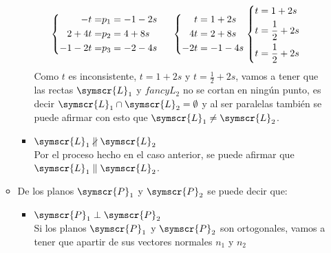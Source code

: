 \documentclass{article}
\def\fancyL{\symscr{L}}
\def\fancyP{\symscr{P}}
\begin{document}
\begin{enumerate}
\begin{itemize}
\begin{itemize}
\[                    \]
                    \[
                        \left\{
                        \begin{aligned}
                            -t = &p_1 = -1 -2s \\
                            2 + 4t = &p_2 = 4 + 8s \\
                            -1 -2t = &p_3 = -2 -4s 
                        \end{aligned}
                        \right.
                        \hspace{0.5cm}
                        \left\{
                        \begin{aligned}
                            t &= 1 +2s \\
                            4t &= 2 + 8s \\
                            -2t &= -1 -4s 
                        \end{aligned}
                        \right.
                        \left\{
                        \begin{aligned}
                            t &= 1 +2s \\
                            t &= \frac{1}{2} + 2s \\
                            t &= \frac{1}{2} + 2s 
                        \end{aligned}
                        \right.
                        \hspace{0.5cm}
                    \]
                    Como \(t\) es inconsistente, \(t = 1 + 2s\) y \(t = \frac{1}{2} + 2s\), vamos a tener que las rectas \(\fancyL_1\) y \(fancyL_2\) no se cortan en ningún punto,
                    es decir \(\fancyL_1 \cap \fancyL_2 = \emptyset\) y al ser paralelas también se puede afirmar con esto que \(\fancyL_1 \neq \fancyL_2\).
                \item \(\fancyL_1 \nparallel \fancyL_2\) \\
                    Por el proceso hecho en el caso anterior, se puede afirmar que \(\fancyL_1 \parallel \fancyL_2\).
            \end{itemize}
        \item De los planos \(\fancyP_1\) y \(\fancyP_2\) se puede decir que:
            \begin{itemize}
                \item \(\fancyP_1 \perp \fancyP_2\) \\
                    Si los planos \(\fancyP_1\) y \(\fancyP_2\) son ortogonales, vamos a tener que apartir de sus vectores normales \(n_1\) y \(n_2\) 

\end{itemize}
\end{itemize}
\end{enumerate}
\end{document}

